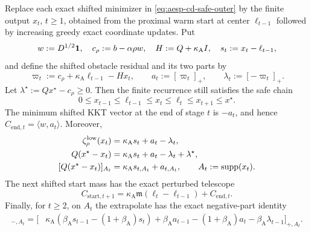 \begin{lemma}
\label{lem:aesp-cd-finite-inner-identities}
Replace each exact shifted minimizer in
\cref{eq:aesp-cd-safe-outer} by the finite output $x_t$, $t\geq1$, obtained from the
proximal warm start at center $\ell_{t-1}$ followed by increasing greedy exact
coordinate updates.  Put
\begin{equation}
 w:=D^{1/2}\mathbf{1},
 \quad c_\rho:=b-\alpha\rho w,
 \quad H:=Q+\kappa_{\mathrm A}I,
 \quad s_t:=x_t-\ell_{t-1},
 \label{eq:aesp-cd-finite-inner-notation}
\end{equation}
and define the shifted obstacle residual and its two parts by
\begin{equation}
 \varpi_t:=c_\rho+\kappa_{\mathrm A}\ell_{t-1}-Hx_t,
 \qquad
 a_t:=[\varpi_t]_+,
 \qquad
 \lambda_t:=[-\varpi_t]_+.
 \label{eq:aesp-cd-finite-inner-residuals}
\end{equation}
Let $\lambda^\star:=Qx^\star-c_\rho\geq0$.  Then the finite recurrence still
satisfies the safe chain
\begin{equation}
 0\leq x_{t-1}\leq\ell_{t-1}\leq x_t\leq\ell_t
 \leq x_{t+1}\leq x^\star.
 \label{eq:aesp-cd-finite-inner-chain}
\end{equation}
The minimum shifted KKT vector at the end of stage $t$ is $-a_t$, and hence
$C_{\mathrm{end},t}=\langle w,a_t\rangle$.  Moreover,
\begin{align}
 \zeta_\rho^{\mathrm{low}}(x_t)
 &=\kappa_{\mathrm A}s_t+a_t-\lambda_t,
 \notag\\
 Q(x^\star-x_t)
 &=\kappa_{\mathrm A}s_t+a_t-\lambda_t+\lambda^\star,
 \label{eq:aesp-cd-finite-inner-fixed-row}\\
 [Q(x^\star-x_t)]_{A_t}
 &=\kappa_{\mathrm A}s_{t,A_t}+a_{t,A_t},
 \qquad A_t:=\operatorname{supp}(x_t).
 \notag
\end{align}
The next shifted start mass has the exact perturbed telescope
\begin{equation}
 C_{\mathrm{start},t+1}
 =\kappa_{\mathrm A}\mathfrak m(\ell_t-\ell_{t-1})
  +C_{\mathrm{end},t}.
 \label{eq:aesp-cd-finite-inner-start-mass}
\end{equation}
Finally, for $t\geq2$, on $A_t$ the extrapolate has the exact negative-part
identity
\begin{align}
 [\zeta_\rho^{\mathrm{low}}(y_t)]_{-,A_t}
 =\bigl[&\kappa_{\mathrm A}
       (\beta_{\mathrm A}s_{t-1}-(1+\beta_{\mathrm A})s_t)
       +\beta_{\mathrm A}a_{t-1}-(1+\beta_{\mathrm A})a_t
       -\beta_{\mathrm A}\lambda_{t-1}\bigr]_{+,A_t}.
 \label{eq:aesp-cd-finite-inner-collapse}

\end{align}
\end{lemma}
